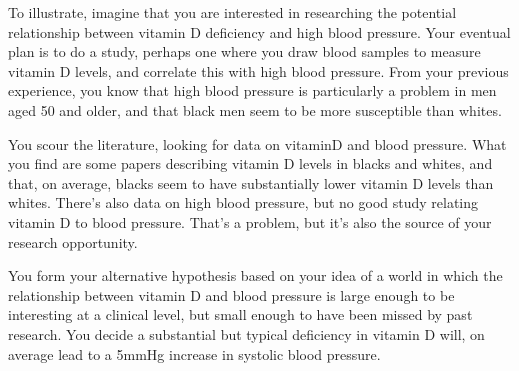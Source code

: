 \begin{example}
To illustrate, imagine that you are interested in
researching the potential relationship between vitamin D deficiency
and high blood pressure.  Your eventual plan is to do a study, perhaps
one where you draw blood samples to measure vitamin D levels, and
correlate this with high blood pressure.  From your previous
experience, you know that high blood pressure is particularly a problem in men aged
50 and older, and that black men seem to be more susceptible than
whites.

You scour the literature, looking for data on vitaminD and blood
pressure.  What you find are some papers describing vitamin D levels
in blacks and whites, and that, on average, blacks seem to have substantially lower
vitamin D levels than whites.  There's also data on high blood
pressure, but no good study relating vitamin D to blood pressure.
That's a problem, but it's also the source of your research opportunity.

You form your alternative hypothesis based on your idea of a world in
which the relationship between vitamin D and blood pressure is large
enough to be interesting at a clinical level, but small enough to have
been missed by past research.  You decide a substantial but typical
deficiency in vitamin D will, on average lead to a 5mmHg increase in
systolic blood pressure.



\end{example}
